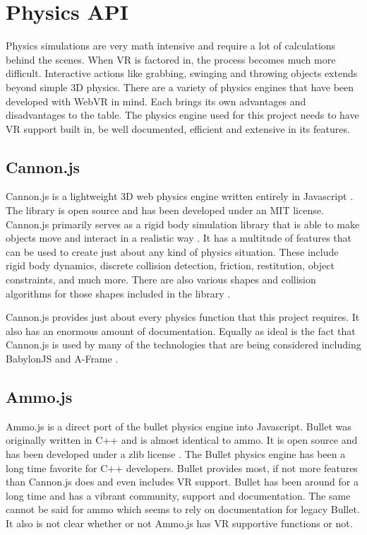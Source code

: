 \section{Physics API}
Physics simulations are very math intensive and require a lot of calculations behind the scenes. When VR is factored in, the process becomes much more difficult. Interactive actions like grabbing, swinging and throwing objects extends beyond simple 3D physics. There are a variety of physics engines that have been developed with WebVR in mind. Each brings its own advantages and disadvantages to the table. The physics engine used for this project needs to have VR support built in, be well documented, efficient and extensive in its features.

\subsection{Cannon.js}
Cannon.js is a lightweight 3D web physics engine written entirely in Javascript \cite{r1}. The library is open source and has been developed under an MIT license. Cannon.js primarily serves as a rigid body simulation library that is able to make objects move and interact in a realistic way \cite{r1}. It has a multitude of features that can be used to create just about any kind of physics situation. These include rigid body dynamics, discrete collision detection, friction, restitution, object constraints, and much more. There are also various shapes and collision algorithms for those shapes included in the library \cite{r1}.

Cannon.js provides just about every physics function that this project requires. It also has an enormous amount of documentation. Equally as ideal is the fact that Cannon.js is used by many of the technologies that are being considered including BabylonJS and A-Frame \cite{r2}.

\subsection{Ammo.js}
Ammo.js is a direct port of the bullet physics engine into Javascript. Bullet was originally written in C++ and is almost identical to ammo. It is open source and has been developed under a zlib license \cite{r3}. The Bullet physics engine has been a long time favorite for C++ developers. Bullet provides most, if not more features than Cannon.js does and even includes VR support. Bullet has been around for a long time and has a vibrant community, support and documentation. The same cannot be said for ammo which seems to rely on documentation for legacy Bullet. It also is not clear whether or not Ammo.js has VR supportive functions or not.

